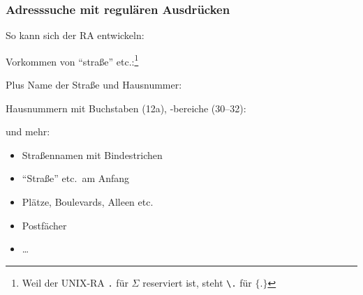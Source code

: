     \begin{frame}
      \frametitle{Adresssuche mit regulären Ausdrücken}
      
      So kann sich der RA entwickeln:
      \begin{Itemize}
        \item
          Vorkommen von "`straße"' etc.:\footnote{%
            Weil der UNIX-RA \texttt{.} für $\Sigma$ reserviert ist,
            steht \texttt{\textbackslash.} für $\{.\}$%
          }
          \par\vspace*{-2mm}
          \RAi
          \par\vspace*{-2mm}
        \item<2->
          Plus Name der Straße und Hausnummer:
          \par\vspace*{-1mm}
          \par\vspace*{-2mm}
        \item<4->
          Hausnummern mit Buchstaben (12a), -bereiche (30--32):
          \par\vspace*{-2mm}
          \par\vspace*{-6mm}
        \item<6->
          und mehr:
          \begin{itemize}
            \item
              Straßennamen mit Bindestrichen
            \item
              "`Straße"' etc.\ am Anfang
            \item
              Plätze, Boulevards, Alleen etc.
            \item
              Postfächer
            \item
              \dots
          \end{itemize}          
      \end{Itemize}

    \end{frame}

